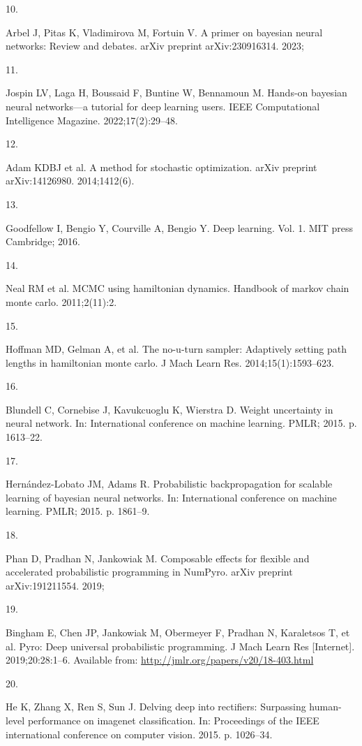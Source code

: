 \documentclass[
  a4paper,
]{scrreprt}
\newlength{\cslhangindent}
\newlength{\csllabelwidth}
\newenvironment{CSLReferences}[2] %
 {\begin{list}{}{%
  \setlength{\itemindent}{0pt}
  \setlength{\leftmargin}{0pt}
  \setlength{\parsep}{0pt}
  \ifodd #1
   \setlength{\leftmargin}{\cslhangindent}
   \setlength{\itemindent}{-1\cslhangindent}
  \fi
  \setlength{\itemsep}{#2\baselineskip}}}
 {\end{list}}
\newcommand{\CSLLeftMargin}[1]{\parbox[t]{\csllabelwidth}{\strut#1\strut}}
\newcommand{\CSLRightInline}[1]{\parbox[t]{\linewidth - \csllabelwidth}{\strut#1\strut}}
\begin{document}
\begin{CSLReferences}{0}{1}
\CSLLeftMargin{10. }%
\CSLRightInline{Arbel J, Pitas K, Vladimirova M, Fortuin V. A primer on
bayesian neural networks: Review and debates. arXiv preprint
arXiv:230916314. 2023; }

\CSLLeftMargin{11. }%
\CSLRightInline{Jospin LV, Laga H, Boussaid F, Buntine W, Bennamoun M.
Hands-on bayesian neural networks---a tutorial for deep learning users.
IEEE Computational Intelligence Magazine. 2022;17(2):29--48. }

\CSLLeftMargin{12. }%
\CSLRightInline{Adam KDBJ et al. A method for stochastic optimization.
arXiv preprint arXiv:14126980. 2014;1412(6). }

\CSLLeftMargin{13. }%
\CSLRightInline{Goodfellow I, Bengio Y, Courville A, Bengio Y. Deep
learning. Vol. 1. MIT press Cambridge; 2016. }

\CSLLeftMargin{14. }%
\CSLRightInline{Neal RM et al. MCMC using hamiltonian dynamics. Handbook
of markov chain monte carlo. 2011;2(11):2. }

\CSLLeftMargin{15. }%
\CSLRightInline{Hoffman MD, Gelman A, et al. The no-u-turn sampler:
Adaptively setting path lengths in hamiltonian monte carlo. J Mach Learn
Res. 2014;15(1):1593--623. }

\CSLLeftMargin{16. }%
\CSLRightInline{Blundell C, Cornebise J, Kavukcuoglu K, Wierstra D.
Weight uncertainty in neural network. In: International conference on
machine learning. PMLR; 2015. p. 1613--22. }

\CSLLeftMargin{17. }%
\CSLRightInline{Hernández-Lobato JM, Adams R. Probabilistic
backpropagation for scalable learning of bayesian neural networks. In:
International conference on machine learning. PMLR; 2015. p. 1861--9. }

\CSLLeftMargin{18. }%
\CSLRightInline{Phan D, Pradhan N, Jankowiak M. Composable effects for
flexible and accelerated probabilistic programming in NumPyro. arXiv
preprint arXiv:191211554. 2019; }

\CSLLeftMargin{19. }%
\CSLRightInline{Bingham E, Chen JP, Jankowiak M, Obermeyer F, Pradhan N,
Karaletsos T, et al. Pyro: Deep universal probabilistic programming. J
Mach Learn Res {[}Internet{]}. 2019;20:28:1--6. Available from:
\url{http://jmlr.org/papers/v20/18-403.html}}

\CSLLeftMargin{20. }%
\CSLRightInline{He K, Zhang X, Ren S, Sun J. Delving deep into
rectifiers: Surpassing human-level performance on imagenet
classification. In: Proceedings of the IEEE international conference on
computer vision. 2015. p. 1026--34. }

\end{CSLReferences}
\end{document}
